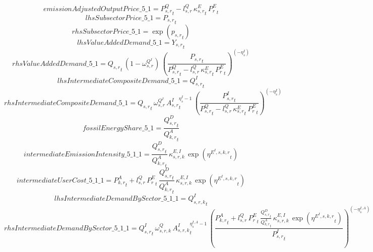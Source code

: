 \begin{dmath*}
emissionAdjustedOutputPrice\_5\_1 = {{P^Q_{s,r}}}_{t}-{{l^{Q}_{s,r}}}\, {{\kappa^{E}_{s,r}}}_{t}\, {{P^E_r}}_{t}
\end{dmath*}
\begin{dmath*}
lhsSubsectorPrice\_5\_1 = {{P_{s,r}}}_{t}
\end{dmath*}
\begin{dmath*}
rhsSubsectorPrice\_5\_1 = \exp\left({{p_{s,r}}}_{t}\right)
\end{dmath*}
\begin{dmath*}
lhsValueAddedDemand\_5\_1 = {{Y_{s,r}}}_{t}
\end{dmath*}
\begin{dmath*}
rhsValueAddedDemand\_5\_1 = {{Q_{s,r}}}_{t}\, \left(1-{{\omega^{Q^{I}}_{s,r}}}\right)\, \left(\frac{{{P_{s,r}}}_{t}}{{{P^Q_{s,r}}}_{t}-{{l^{Q}_{s,r}}}\, {{\kappa^{E}_{s,r}}}_{t}\, {{P^E_r}}_{t}}\right)^{\left(-{{\eta^{I}_{s}}}\right)}
\end{dmath*}
\begin{dmath*}
lhsIntermediateCompositeDemand\_5\_1 = {{Q^{I}_{s,r}}}_{t}
\end{dmath*}
\begin{dmath*}
rhsIntermediateCompositeDemand\_5\_1 = {{Q_{s,r}}}_{t}\, {{\omega^{Q^{I}}_{s,r}}}\, {{A^{I}_{s,r}}}_{t}^{{{\eta^{I}_{s}}}-1}\, \left(\frac{{{P^{I}_{s,r}}}_{t}}{{{P^Q_{s,r}}}_{t}-{{l^{Q}_{s,r}}}\, {{\kappa^{E}_{s,r}}}_{t}\, {{P^E_r}}_{t}}\right)^{\left(-{{\eta^{I}_{s}}}\right)}
\end{dmath*}
\begin{dmath*}
fossilEnergyShare\_5\_1 = \frac{{{Q^{D}_{s,r}}}_{t}}{{{Q^{A}_{k,r}}}_{t}}
\end{dmath*}
\begin{dmath*}
intermediateEmissionIntensity\_5\_1\_1 = \frac{{{Q^{D}_{s,r}}}_{t}}{{{Q^{A}_{k,r}}}_{t}}\, {{\kappa^{E,I}_{s,r,k}}}\, \exp\left({{\eta^{E^{I},s,k,r}}}_{t}\right)
\end{dmath*}
\begin{dmath*}
intermediateUserCost\_5\_1\_1 = {{P^{A}_{k,r}}}_{t}+{{l^{Q}_{s,r}}}\, {{P^E_r}}_{t}\, \frac{{{Q^{D}_{s,r}}}_{t}}{{{Q^{A}_{k,r}}}_{t}}\, {{\kappa^{E,I}_{s,r,k}}}\, \exp\left({{\eta^{E^{I},s,k,r}}}_{t}\right)
\end{dmath*}
\begin{dmath*}
lhsIntermediateDemandBySector\_5\_1\_1 = {{Q^{I}_{s,r,k}}}_{t}
\end{dmath*}
\begin{dmath*}
rhsIntermediateDemandBySector\_5\_1\_1 = {{Q^{I}_{s,r}}}_{t}\, {{\omega^{Q}_{s,r,k}}}\, {{A^{I}_{s,r,k}}}_{t}^{{{\eta^{I,A}_{s}}}-1}\, \left(\frac{{{P^{A}_{k,r}}}_{t}+{{l^{Q}_{s,r}}}\, {{P^E_r}}_{t}\, \frac{{{Q^{D}_{s,r}}}_{t}}{{{Q^{A}_{k,r}}}_{t}}\, {{\kappa^{E,I}_{s,r,k}}}\, \exp\left({{\eta^{E^{I},s,k,r}}}_{t}\right)}{{{P^{I}_{s,r}}}_{t}}\right)^{\left(-{{\eta^{I,A}_{s}}}\right)}
\end{dmath*}
